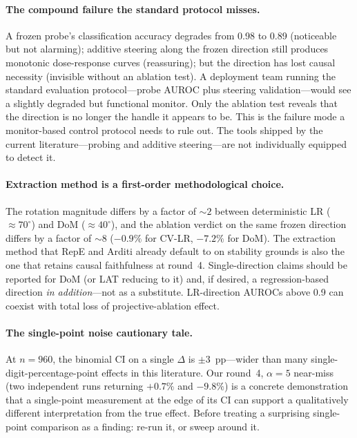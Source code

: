 \documentclass[11pt]{article}
\begin{document}
\paragraph{The compound failure the standard protocol misses.} A
frozen probe's classification accuracy degrades from 0.98 to 0.89
(noticeable but not alarming); additive steering along the frozen
direction still produces monotonic dose-response curves (reassuring);
but the direction has lost causal necessity (invisible without an
ablation test). A deployment team running the standard evaluation
protocol---probe AUROC plus steering validation---would see a
slightly degraded but functional monitor. Only the ablation test
reveals that the direction is no longer the handle it appears to be.
This is the failure mode a monitor-based control protocol needs to
rule out. The tools shipped by the current literature---probing and
additive steering---are not individually equipped to detect it.

\paragraph{Extraction method is a first-order methodological choice.}
The rotation magnitude differs by a factor of ${\sim}2$ between
deterministic LR ($\approx\!70^\circ$) and DoM ($\approx\!40^\circ$),
and the ablation verdict on the same frozen direction differs by a
factor of ${\sim}8$ ($-0.9\%$ for CV-LR, $-7.2\%$ for DoM). The
extraction method that RepE and Arditi already default to on stability
grounds is also the one that retains causal faithfulness at round~4.
Single-direction claims should be reported for DoM (or LAT reducing to
it) and, if desired, a regression-based direction \emph{in
addition}---not as a substitute. LR-direction AUROCs above 0.9 can
coexist with total loss of projective-ablation effect.

\paragraph{The single-point noise cautionary tale.} At $n{=}960$, the
binomial CI on a single $\Delta$ is $\pm 3$~pp---wider than many
single-digit-percentage-point effects in this literature. Our
round~4, $\alpha{=}5$ near-miss (two independent runs returning
$+0.7\%$ and $-9.8\%$) is a concrete demonstration that a single-point
measurement at the edge of its CI can support a qualitatively
different interpretation from the true effect. Before treating a
surprising single-point comparison as a finding: re-run it, or sweep
around it.
\end{document}
